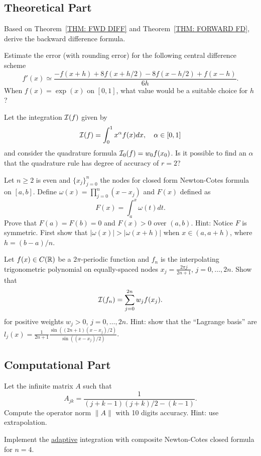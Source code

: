 \subsection{Theoretical Part}
\begin{problem}
\label{Prb: 3-Bac-Dif}
    Based on Theorem~\ref{THM: FWD DIFF} and Theorem~\ref{THM: FORWARD FD}, derive the backward difference formula.
\end{problem}
\begin{problem}
    Estimate the error (with rounding error) for the following central difference scheme
    $$f'(x)\simeq \frac{-f(x + h) + 8f(x + h/2) - 8 f(x - h/2) + f(x - h)}{6h}.$$
    When $f(x)=\exp(x)$ on $[0, 1]$, what value would be a suitable choice for $h$?
\end{problem}
\begin{problem}
    Let the integration $\mathcal I(f)$ given by
    $$\mathcal I(f) = \int_0^1 x^{\alpha} f(x) dx,\quad \alpha\in [0, 1]$$
    and consider the quadrature formula $\mathcal I_0(f) = w_0 f(x_0)$. Is it possible to find an $\alpha$ that the quadrature rule has degree of accuracy of $r= 2$?
\end{problem}
\begin{problem}
    Let $n\ge 2$ is even and $\{ x_j\}_{j=0}^n$ the nodes for closed form Newton-Cotes formula on $[a, b]$. Define $\omega(x)=\prod_{j=0}^n (x - x_j)$ and $F(x)$ defined as 
    $$F(x) = \int_a^x \omega(t)dt.$$
    Prove that $F(a) = F(b) = 0$ and $F(x) > 0$ over $(a ,b)$. 
    Hint: Notice $F$ is symmetric. First show that $|\omega(x)| > |\omega(x + h)|$ when $x\in (a, a + h)$, where $h = (b-a)/n$.
\end{problem}
\begin{problem}
    Let $f(x)\in C(\mathbb R)$ be a $2\pi$-periodic function and $f_n$ is the interpolating trigonometric polynomial on equally-spaced nodes $x_j = \frac{2\pi j}{2n+1}$, $j=0,\dots, 2n$. Show that 
    \begin{equation}
       \mathcal I(f_n) = \sum_{j=0}^{2n} w_j f(x_j).
    \end{equation}
    for positive weights $w_j > 0$, $j = 0,\dots, 2n$.
    Hint: show that the ``Lagrange basis'' are $l_j(x) =\frac{1}{2n+1} \frac{\sin((2n+1)(x- x_j)/2)}{\sin((x-x_j)/2)}$.
\end{problem}

 
\subsection{Computational Part}
\begin{problem}
    Let the infinite matrix $A$ such that $$A_{jk} = \frac{1}{(j+k-1)(j+k)/2 - (k-1)}.$$
    Compute the operator norm $\|A\|$ with 10 digits accuracy. Hint: use extrapolation.
\end{problem}
\begin{problem}
    Implement the \underline{adaptive} integration with  composite Newton-Cotes closed formula for $n = 4$. 
\end{problem}



